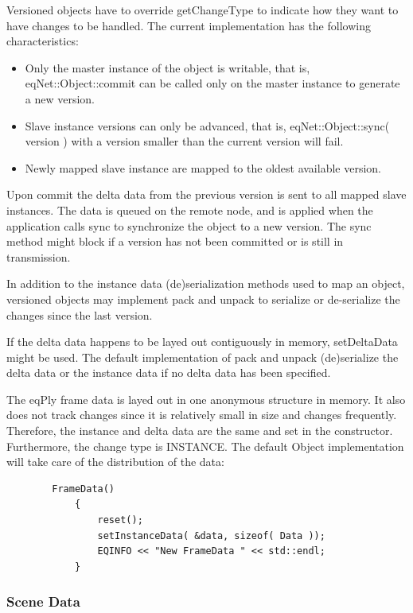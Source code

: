 \documentclass[10pt,a4]{scrartcl}
\begin{document}
Versioned objects have to override \textsf{getChangeType} to indicate
how they want to have changes to be handled. The current
implementation has the following characteristics:
\begin{itemize}
\item Only the master instance of the object is writable, that is,
  \textsf{eqNet::Object::com\-mit} can be called only on the master
  instance to generate a new version.
\item Slave instance versions can only be advanced, that is,
  \textsf{eqNet::Object::sync( version )} with a version smaller than
  the current version will fail.
\item Newly mapped slave instance are mapped to the oldest available
  version.
\end{itemize}

Upon \textsf{commit} the delta data from the previous version is sent to
all mapped slave instances. The data is queued on the remote node, and
is applied when the application calls \textsf{sync} to synchronize the
object to a new version. The \textsf{sync} method might block if a
version has not been committed or is still in transmission.

In addition to the instance data (de)serialization methods used to map
an object, versioned objects may implement \textsf{pack} and
\textsf{unpack} to serialize or de-serialize the changes since the last
version.

If the delta data happens to be layed out contiguously in memory,
\textsf{setDeltaData} might be used. The default implementation of
\textsf{pack} and \textsf{unpack} (de)serialize the delta data or the
instance data if no delta data has been specified.

The \textsf{eqPly} frame data is layed out in one anonymous structure in
memory. It also does not track changes since it is relatively small in
size and changes frequently. Therefore, the instance and delta data are
the same and set in the constructor. Furthermore, the change type is
\textsf{INSTANCE}. The default \textsf{Object} implementation will take
care of the distribution of the data:

{\footnotesize\begin{lstlisting}
        FrameData()
            {
                reset();
                setInstanceData( &data, sizeof( Data ));
                EQINFO << "New FrameData " << std::endl;
            }
\end{lstlisting}}%

\subsubsection{\label{sSceneData}Scene Data}
\end{document}
